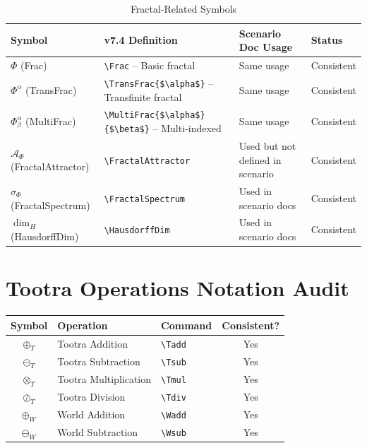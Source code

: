 \documentclass[11pt]{article}
\begin{document}
\begin{longtable}{L{3cm}|L{4cm}|L{4cm}|L{3cm}}
\caption{Fractal-Related Symbols} \\
\toprule
\textbf{Symbol} & \textbf{v7.4 Definition} & \textbf{Scenario Doc Usage} & \textbf{Status} \\
\midrule
\endfirsthead
\midrule
\endhead
\bottomrule
\endlastfoot

$\Phi$ (Frac)
& \verb|\Frac| -- Basic fractal
& Same usage
& Consistent \\

\midrule
$\Phi^\alpha$ (TransFrac)
& \verb|\TransFrac{$\alpha$}| -- Transfinite fractal
& Same usage
& Consistent \\

\midrule
$\Phi^\alpha_\beta$ (MultiFrac)
& \verb|\MultiFrac{$\alpha$}{$\beta$}| -- Multi-indexed
& Same usage
& Consistent \\

\midrule
$\mathcal{A}_\Phi$ (FractalAttractor)
& \verb|\FractalAttractor|
& Used but not defined in scenario
& Consistent \\

\midrule
$\sigma_\Phi$ (FractalSpectrum)
& \verb|\FractalSpectrum|
& Used in scenario docs
& Consistent \\

\midrule
$\dim_H$ (HausdorffDim)
& \verb|\HausdorffDim|
& Used in scenario docs
& Consistent \\

\end{longtable}

\section{Tootra Operations Notation Audit}

\begin{center}
\begin{tabular}{c|l|l|c}
\toprule
\textbf{Symbol} & \textbf{Operation} & \textbf{Command} & \textbf{Consistent?} \\
\midrule
$\oplus_T$ & Tootra Addition & \verb|\Tadd| & Yes \\
$\ominus_T$ & Tootra Subtraction & \verb|\Tsub| & Yes \\
$\otimes_T$ & Tootra Multiplication & \verb|\Tmul| & Yes \\
$\oslash_T$ & Tootra Division & \verb|\Tdiv| & Yes \\
$\oplus_W$ & World Addition & \verb|\Wadd| & Yes \\
$\ominus_W$ & World Subtraction & \verb|\Wsub| & Yes \\
\bottomrule
\end{tabular}
\end{center}
\end{document}
